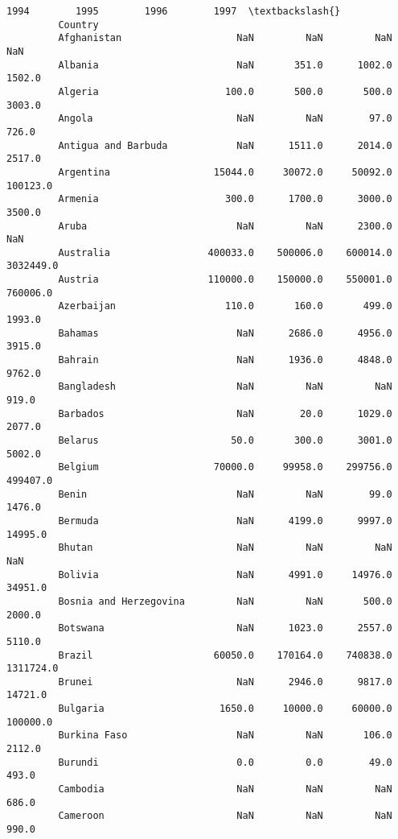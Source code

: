 \documentclass[11pt]{article}
\begin{document}
\begin{Verbatim}[commandchars=\\\{\}]
                                       1994        1995        1996        1997  \textbackslash{}
         Country                                                                  
         Afghanistan                    NaN         NaN         NaN         NaN   
         Albania                        NaN       351.0      1002.0      1502.0   
         Algeria                      100.0       500.0       500.0      3003.0   
         Angola                         NaN         NaN        97.0       726.0   
         Antigua and Barbuda            NaN      1511.0      2014.0      2517.0   
         Argentina                  15044.0     30072.0     50092.0    100123.0   
         Armenia                      300.0      1700.0      3000.0      3500.0   
         Aruba                          NaN         NaN      2300.0         NaN   
         Australia                 400033.0    500006.0    600014.0   3032449.0   
         Austria                   110000.0    150000.0    550001.0    760006.0   
         Azerbaijan                   110.0       160.0       499.0      1993.0   
         Bahamas                        NaN      2686.0      4956.0      3915.0   
         Bahrain                        NaN      1936.0      4848.0      9762.0   
         Bangladesh                     NaN         NaN         NaN       919.0   
         Barbados                       NaN        20.0      1029.0      2077.0   
         Belarus                       50.0       300.0      3001.0      5002.0   
         Belgium                    70000.0     99958.0    299756.0    499407.0   
         Benin                          NaN         NaN        99.0      1476.0   
         Bermuda                        NaN      4199.0      9997.0     14995.0   
         Bhutan                         NaN         NaN         NaN         NaN   
         Bolivia                        NaN      4991.0     14976.0     34951.0   
         Bosnia and Herzegovina         NaN         NaN       500.0      2000.0   
         Botswana                       NaN      1023.0      2557.0      5110.0   
         Brazil                     60050.0    170164.0    740838.0   1311724.0   
         Brunei                         NaN      2946.0      9817.0     14721.0   
         Bulgaria                    1650.0     10000.0     60000.0    100000.0   
         Burkina Faso                   NaN         NaN       106.0      2112.0   
         Burundi                        0.0         0.0        49.0       493.0   
         Cambodia                       NaN         NaN         NaN       686.0   
         Cameroon                       NaN         NaN         NaN       990.0   

\end{Verbatim}
\end{document}
